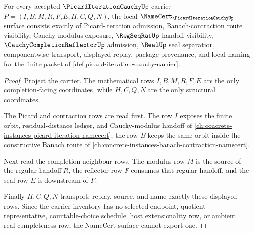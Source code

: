 \begin{theorem}
\label{thm:picard-iteration-cauchy-namecert-obligations}
For every accepted $\PicardIterationCauchyUp$ carrier $P=(I,B,M,R,F,E,H,C,Q,N)$, the local $\NameCert_{\PicardIterationCauchyUp}$ surface consists exactly of Picard-iteration admission, Banach-contraction route visibility, Cauchy-modulus exposure, $\RegSeqRatUp$ handoff visibility, $\CauchyCompletionReflectorUp$ admission, $\RealUp$ seal separation, componentwise transport, displayed replay, package provenance, and local naming for the finite packet of \autoref{def:picard-iteration-cauchy-carrier}.
\end{theorem}
\begin{proof}
Project the carrier. The mathematical rows $I,B,M,R,F,E$ are the only completion-facing coordinates, while $H,C,Q,N$ are the only structural coordinates.

The Picard and contraction rows are read first. The row $I$ exposes the finite orbit, residual-distance ledger, and Cauchy-modulus handoff of \autoref{ch:concrete-instances-picard-iteration-namecert}; the row $B$ keeps the same orbit inside the constructive Banach route of \autoref{ch:concrete-instances-banach-contraction-namecert}.

Next read the completion-neighbour rows. The modulus row $M$ is the source of the regular handoff $R$, the reflector row $F$ consumes that regular handoff, and the seal row $E$ is downstream of $F$.

Finally $H,C,Q,N$ transport, replay, source, and name exactly these displayed rows. Since the carrier inventory has no selected endpoint, quotient representative, countable-choice schedule, host extensionality row, or ambient real-completeness row, the NameCert surface cannot export one.
\end{proof}

